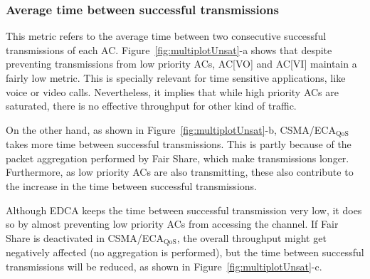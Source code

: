 \subsubsection{Average time between successful transmissions}
This metric refers to the average time between two consecutive successful transmissions of each AC. Figure~\ref{fig:multiplotUnsat}-a shows that despite preventing transmissions from low priority ACs, AC[VO] and AC[VI] maintain a fairly low metric. This is specially relevant for time sensitive applications, like voice or video calls. Nevertheless, it implies that while high priority ACs are saturated, there is no effective throughput for other kind of traffic.

On the other hand, as shown in Figure~\ref{fig:multiplotUnsat}-b, CSMA/ECA$_{\text{QoS}}$ takes more time between successful transmissions. This is partly because of the packet aggregation performed by Fair Share, which make transmissions longer. Furthermore, as low priority ACs are also transmitting, these also contribute to the increase in the time between successful transmissions. 

Although EDCA keeps the time between successful transmission very low, it does so by almost preventing low priority ACs from accessing the channel. If Fair Share is deactivated in CSMA/ECA$_{\text{QoS}}$, the overall throughput might get negatively affected (no aggregation is performed), but the time between successful transmissions will be reduced, as shown in Figure~\ref{fig:multiplotUnsat}-c.
	
%
	

